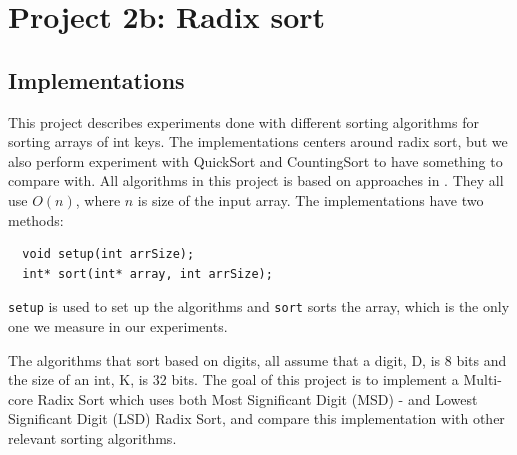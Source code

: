 
\chapter{Project 2b: Radix sort} %

\label{Chapter3} %




\section{Implementations}
This project describes experiments done with different sorting algorithms for sorting arrays of int keys. The implementations centers around radix sort, but we also perform experiment with QuickSort and CountingSort to have something to compare with.
All algorithms in this project is based on approaches in \citep{radixSort}.
They all use $O(n)$, where $n$ is size of the input array.
The implementations have two methods:
\begin{lstlisting}
  void setup(int arrSize);
  int* sort(int* array, int arrSize);
\end{lstlisting}
\verb!setup! is used to set up the algorithms and \verb!sort! sorts the array, which is the only one we measure in our experiments.

The algorithms that sort based on digits, all assume that a digit, D, is 8 bits and the size of an int, K, is 32 bits.
The goal of this project is to implement a Multi-core Radix Sort which uses both Most Significant Digit (MSD) - and Lowest Significant Digit (LSD) Radix Sort, and compare this implementation with other relevant sorting algorithms.


